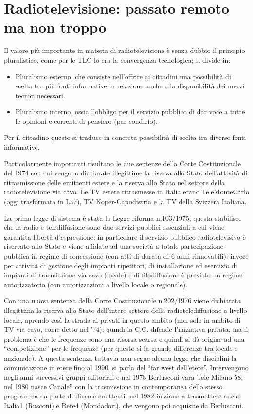 \section{Radiotelevisione: passato remoto ma non troppo}

Il valore più importante in materia di radiotelevisione è senza dubbio il principio pluralistico, come per le TLC lo era la convergenza tecnologica; si divide in:
\begin{itemize}
    \item Pluralismo esterno, che consiste nell’offrire ai cittadini una possibilità di scelta tra più fonti informative in relazione anche alla disponibilità dei mezzi tecnici necessari.
    \item Pluralismo interno, ossia l’obbligo per il servizio pubblico di dar voce a tutte le opinioni e correnti di pensiero (par condicio).
\end{itemize}

Per il cittadino questo si traduce in concreta possibilità di scelta tra diverse fonti informative.

Particolarmente importanti risultano le due sentenze della Corte Costituzionale del 1974 con cui vengono
dichiarate illegittime la riserva allo Stato dell'attività di ritrasmissione delle emittenti estere e la riserva allo
Stato nel settore della radiotelevisione via cavo. Le TV estere ritrasmesse in Italia erano TeleMonteCarlo (oggi
trasformata in La7), TV Koper-Capodistria e la TV della Svizzera Italiana.\bigskip

La prima legge di sistema è stata la Legge riforma n.103/1975; questa stabilisce che la radio e telediffusione sono due servizi pubblici essenziali a cui viene garantita libertà d’espressione; in particolare il servizio pubblico radiotelevisivo è riservato allo Stato e viene affidato ad una società a totale partecipazione pubblica in regime di concessione (con atti di durata di 6 anni rinnovabili); invece per attività di gestione degli impianti ripetitori,
di installazione ed esercizio di impianti di trasmissione via cavo (locale) e di filodiffusione è previsto un regime autorizzatorio (con autorizzazioni a livello locale o regionale).


Con una nuova sentenza della Corte Costituzionale n.202/1976 viene dichiarata illegittima la riserva allo
Stato dell’intero settore della radiotelediffusione a livello locale, aprendo così la strada ai privati in questo
ambito (non solo in ambito di TV via cavo, come detto nel '74); quindi la C.C. difende l’iniziativa privata, ma il problema è che le frequenze sono una risorsa scarsa e quindi si dà origine ad una “competizione” per le frequenze (per questo si fa grande differenza tra locale e nazionale). A questa sentenza tuttavia non segue alcuna legge che disciplini la comunicazione in etere fino al 1990, si parla del “far west dell’etere”. Intervengono negli anni successivi gruppi editoriali e nel 1978 Berlusconi vara Tele Milano 58; nel 1980 nasce Canale5 con la trasmissione in contemporanea dello stesso programma da parte di diverse emittenti; nel 1982 iniziano a trasmettere anche Italia1 (Rusconi) e Rete4 (Mondadori), che vengono poi acquisite da Berlusconi.


